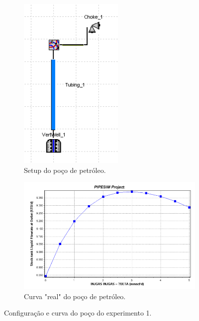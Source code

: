 \begin{figure}[H]
\centering
\begin{subfigure}{.4\textwidth}
  \centering
  \includegraphics[height=1\linewidth]{figs/setup1.png}
  \caption{Setup do poço de petróleo.}
  \label{fig:setup1_dia}
\end{subfigure}%
\begin{subfigure}{.6\textwidth}
  \centering
  \includegraphics[height=0.7\linewidth]{figs/truth1.png}
  \caption{Curva "real" do poço de petróleo.}
  \label{fig:truth1}
\end{subfigure}
\caption{Configuração e curva do poço do experimento 1.}
\label{fig:setup1}
\end{figure}

